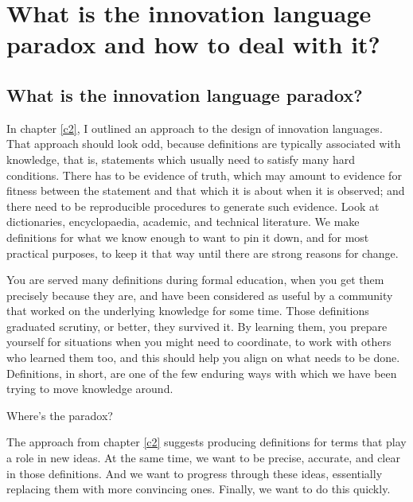 \chapter{What is the innovation language paradox and how to deal with it?}
\label{c3}



\section{What is the innovation language paradox?}
\label{c3:s1}
In chapter \ref{c2}, I outlined an approach to the design of innovation languages. That approach should look odd, because definitions are typically associated with knowledge, that is, statements which usually need to satisfy many hard conditions. There has to be evidence of truth, which may amount to evidence for fitness between the statement and that which it is about when it is observed; and there need to be reproducible procedures to generate such evidence. Look at dictionaries, encyclopaedia, academic, and technical literature. We make definitions for what we know enough to want to pin it down, and for most practical purposes, to keep it that way until there are strong reasons for change.

You are served many definitions during formal education, when you get them precisely because they are, and have been considered as useful by a community that worked on the underlying knowledge for some time. Those definitions graduated scrutiny, or better, they survived it. By learning them, you prepare yourself for situations when you might need to coordinate, to work with others who learned them too, and this should help you align on what needs to be done. Definitions, in short, are one of the few enduring ways with which we have been trying to move knowledge around.

Where's the paradox?

The approach from chapter \ref{c2} suggests producing definitions for terms that play a role in new ideas. At the same time, we want to be precise, accurate, and clear in those definitions. And we want to progress through these ideas, essentially replacing them with more convincing ones. Finally, we want to do this quickly. 

